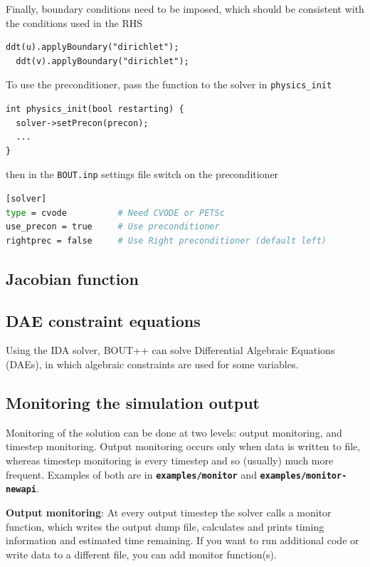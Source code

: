 \documentclass[12pt]{article}
\newcommand{\file}[1]{\texttt{\bf #1}}
\begin{document}
%
Finally, boundary conditions need to be imposed, which should be consistent
with the conditions used in the RHS
%
\begin{lstlisting}[numbers=none]
  ddt(u).applyBoundary("dirichlet");
  ddt(v).applyBoundary("dirichlet");
\end{lstlisting}
%
To use the preconditioner, pass the function to the solver in
%
\lstinline!physics_init!
%
\begin{lstlisting}
int physics_init(bool restarting) {
  solver->setPrecon(precon);
  ...
}
\end{lstlisting}
%
then in the \texttt{BOUT.inp} settings file switch on the preconditioner
%
\begin{lstlisting}[language=bash,numbers=none]
[solver]
type = cvode          # Need CVODE or PETSc
use_precon = true     # Use preconditioner
rightprec = false     # Use Right preconditioner (default left)
\end{lstlisting}
%



\subsection{Jacobian function}
%



\subsection{DAE constraint equations}
%
Using the IDA solver, BOUT++ can solve Differential Algebraic Equations (DAEs),
in which algebraic constraints are used for some variables.



\subsection{Monitoring the simulation output}
%
Monitoring of the solution can be done at two levels: output monitoring, and
timestep monitoring. Output monitoring occurs only when data is written to
file, whereas timestep monitoring is every timestep and so (usually) much more
frequent. Examples of both are in \file{examples/monitor} and
\file{examples/monitor-newapi}.

{\bf Output monitoring}: At every output timestep the solver calls a monitor
function, which writes the output dump file, calculates and prints timing
information and estimated time remaining. If you want to run additional code or
write data to a different file, you can add monitor function(s).
\end{document}
